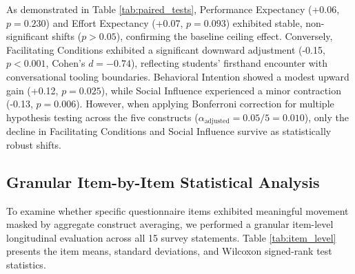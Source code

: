 \documentclass{cleiej}
\begin{document}
As demonstrated in Table \ref{tab:paired_tests}, Performance Expectancy (+0.06, $p = 0.230$) and Effort Expectancy (+0.07, $p = 0.093$) exhibited stable, non-significant shifts ($p > 0.05$), confirming the baseline ceiling effect. Conversely, Facilitating Conditions exhibited a significant downward adjustment (-0.15, $p < 0.001$, Cohen's $d = -0.74$), reflecting students' firsthand encounter with conversational tooling boundaries. Behavioral Intention showed a modest upward gain (+0.12, $p = 0.025$), while Social Influence experienced a minor contraction (-0.13, $p = 0.006$). However, when applying Bonferroni correction for multiple hypothesis testing across the five constructs ($\alpha_{\text{adjusted}} = 0.05 / 5 = 0.010$), only the decline in Facilitating Conditions and Social Influence survive as statistically robust shifts.

\subsection{Granular Item-by-Item Statistical Analysis}
To examine whether specific questionnaire items exhibited meaningful movement masked by aggregate construct averaging, we performed a granular item-level longitudinal evaluation across all 15 survey statements. Table \ref{tab:item_level} presents the item means, standard deviations, and Wilcoxon signed-rank test statistics.
\end{document}
